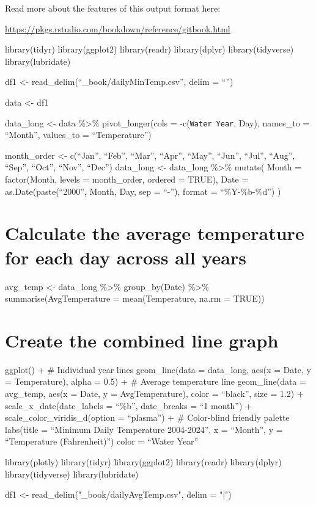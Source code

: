 \documentclass[
]{book}
\newenvironment{Shaded}{\begin{snugshade}}{\end{snugshade}}
\newcommand{\AttributeTok}[1]{\textcolor[rgb]{0.77,0.63,0.00}{#1}}
\newcommand{\FunctionTok}[1]{\textcolor[rgb]{0.00,0.00,0.00}{#1}}
\newcommand{\NormalTok}[1]{#1}
\newcommand{\OtherTok}[1]{\textcolor[rgb]{0.56,0.35,0.01}{#1}}
\newcommand{\StringTok}[1]{\textcolor[rgb]{0.31,0.60,0.02}{#1}}
\theoremstyle{definition}
\theoremstyle{definition}
\theoremstyle{definition}
\theoremstyle{definition}
\theoremstyle{remark}
\begin{document}
Read more about the features of this output format here:

\url{https://pkgs.rstudio.com/bookdown/reference/gitbook.html}

library(tidyr)
library(ggplot2)
library(readr)
library(dplyr)
library(tidyverse)
library(lubridate)

df1 \textless- read\_delim(``\_book/dailyMinTemp.csv'', delim = ``\textbar{}'')

data \textless- df1

data\_long \textless- data \%\textgreater\%
pivot\_longer(cols = -c(\texttt{Water\ Year}, Day),
names\_to = ``Month'',
values\_to = ``Temperature'')

month\_order \textless- c(``Jan'', ``Feb'', ``Mar'', ``Apr'', ``May'', ``Jun'', ``Jul'', ``Aug'', ``Sep'', ``Oct'', ``Nov'', ``Dec'')
data\_long \textless- data\_long \%\textgreater\%
mutate(
Month = factor(Month, levels = month\_order, ordered = TRUE),
Date = as.Date(paste(``2000'', Month, Day, sep = ``-''), format = ``\%Y-\%b-\%d'')
)

\hypertarget{calculate-the-average-temperature-for-each-day-across-all-years}{%
\chapter{Calculate the average temperature for each day across all years}\label{calculate-the-average-temperature-for-each-day-across-all-years}}

avg\_temp \textless- data\_long \%\textgreater\%
group\_by(Date) \%\textgreater\%
summarise(AvgTemperature = mean(Temperature, na.rm = TRUE))

\hypertarget{create-the-combined-line-graph}{%
\chapter{Create the combined line graph}\label{create-the-combined-line-graph}}

ggplot() +
\# Individual year lines
geom\_line(data = data\_long,
aes(x = Date, y = Temperature),
alpha = 0.5) +
\# Average temperature line
geom\_line(data = avg\_temp,
aes(x = Date, y = AvgTemperature),
color = ``black'', size = 1.2) +
scale\_x\_date(date\_labels = ``\%b'', date\_breaks = ``1 month'') +
scale\_color\_viridis\_d(option = ``plasma'') + \# Color-blind friendly palette
labs(title = ``Minimum Daily Temperature 2004-2024'',
x = ``Month'',
y = ``Temperature (Fahrenheit)'')
color = ``Water Year''

\begin{Shaded}
\begin{Highlighting}[]
\FunctionTok{library}\NormalTok{(plotly)}
\FunctionTok{library}\NormalTok{(tidyr)}
\FunctionTok{library}\NormalTok{(ggplot2)}
\FunctionTok{library}\NormalTok{(readr)}
\FunctionTok{library}\NormalTok{(dplyr)}
\FunctionTok{library}\NormalTok{(tidyverse)}
\FunctionTok{library}\NormalTok{(lubridate)}

\NormalTok{df1 }\OtherTok{\textless{}{-}} \FunctionTok{read\_delim}\NormalTok{(}\StringTok{"\_book/dailyAvgTemp.csv"}\NormalTok{, }\AttributeTok{delim =} \StringTok{"|"}\NormalTok{)}
\end{Highlighting}
\end{Shaded}
\end{document}
